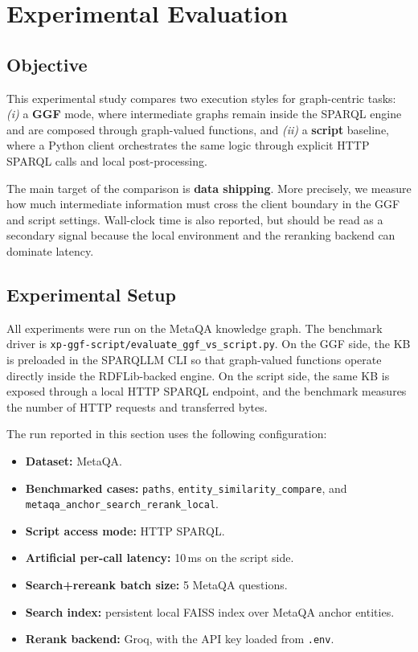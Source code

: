 \section{Experimental Evaluation}
\label{sec:experiments}

\subsection{Objective}
\label{subsec:objective}

This experimental study compares two execution styles for graph-centric tasks:
\emph{(i)} a \textbf{GGF} mode, where intermediate graphs remain inside the
SPARQL engine and are composed through graph-valued functions, and
\emph{(ii)} a \textbf{script} baseline, where a Python client orchestrates the
same logic through explicit HTTP SPARQL calls and local post-processing.

The main target of the comparison is \textbf{data shipping}. More precisely, we
measure how much intermediate information must cross the client boundary in the
GGF and script settings. Wall-clock time is also reported, but should be read
as a secondary signal because the local environment and the reranking backend
can dominate latency.

\subsection{Experimental Setup}
\label{subsec:setup}

All experiments were run on the MetaQA knowledge graph. The benchmark driver is
\texttt{xp-ggf-script/evaluate\_ggf\_vs\_script.py}. On the GGF side, the KB is
preloaded in the SPARQLLM CLI so that graph-valued functions operate directly
inside the RDFLib-backed engine. On the script side, the same KB is exposed
through a local HTTP SPARQL endpoint, and the benchmark measures the number of
HTTP requests and transferred bytes.

The run reported in this section uses the following configuration:
\begin{itemize}
\item \textbf{Dataset:} MetaQA.
\item \textbf{Benchmarked cases:} \texttt{paths},
\texttt{entity\_similarity\_compare}, and
\texttt{metaqa\_anchor\_search\_rerank\_local}.
\item \textbf{Script access mode:} HTTP SPARQL.
\item \textbf{Artificial per-call latency:} 10\,ms on the script side.
\item \textbf{Search+rereank batch size:} 5 MetaQA questions.
\item \textbf{Search index:} persistent local FAISS index over MetaQA anchor
entities.
\item \textbf{Rerank backend:} Groq, with the API key loaded from
\texttt{.env}.
\end{itemize}

